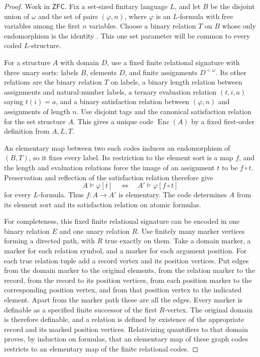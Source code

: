 \documentclass[11pt,a4paper]{amsart}
\newcommand{\ZFC}{\mathsf{ZFC}}
\theoremstyle{plain}
\theoremstyle{definition}
\theoremstyle{remark}
\begin{document}
\begin{proof}
Work in $\ZFC$.  Fix a set-sized finitary language $L$, and let $B$
be the disjoint union of $\omega$ and the set of pairs $(\varphi,n)$,
where $\varphi$ is an $L$-formula with free variables among the first
$n$ variables.  Choose a binary relation $T$ on $B$ whose only
endomorphism is the identity \cite[Theorem~2]{VopenkaPultrHedrlin}.
This one set parameter will be common to every coded $L$-structure.

For a structure $A$ with domain $D$, use a fixed finite relational
signature with three unary sorts: labels $B$, elements $D$, and
finite assignments $D^{<\omega}$.  Its other relations are the
binary relation $T$ on labels, a binary length relation between
assignments and natural-number labels, a ternary evaluation
relation $(t,i,a)$ saying $t(i)=a$, and a binary satisfaction
relation between $(\varphi,n)$ and assignments of length $n$.
Use disjoint tags and the canonical satisfaction relation for the
set structure $A$.  This gives a unique code $\operatorname{Enc}(A)$
by a fixed first-order definition from $A,L,T$.

An elementary map between two such codes induces an endomorphism
of $(B,T)$, so it fixes every label.  Its restriction to the element
sort is a map $f$, and the length and evaluation relations force
the image of an assignment $t$ to be $f\circ t$.  Preservation and
reflection of the satisfaction relation therefore give
\[
A\models\varphi[t]\quad\Longleftrightarrow\quad
A'\models\varphi[f\circ t]
\]
for every $L$-formula.  Thus $f:A\to A'$ is elementary.
The code determines $A$ from its element sort and its satisfaction
relation on atomic formulas.

For completeness, this fixed finite relational signature can be
encoded in one binary relation $E$ and one unary relation $R$.
Use finitely many marker vertices forming a directed path, with
$R$ true exactly on them.  Take a domain marker, a marker for each
relation symbol, and a marker for each argument position.  For
each true relation tuple add a record vertex and its position
vertices.  Put edges from the domain marker to the original
elements, from the relation marker to the record, from the record
to its position vertices, from each position marker to the
corresponding position vertex, and from that position vertex to
the indicated element.  Apart from the marker path these are
all the edges.  Every marker is definable as a specified finite
successor of the first $R$-vertex.  The original domain is
therefore definable, and a relation is defined by existence of
the appropriate record and its marked position vertices.
Relativizing quantifiers to that domain proves, by induction on
formulas, that an elementary map of these graph codes restricts
to an elementary map of the finite relational codes.


\end{proof}
\end{document}
